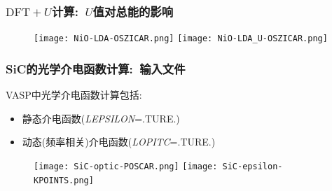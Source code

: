 \frame%
{
	\frametitle{$\mathrm{DFT}+U$计算:~$U$值对总能的影响}
\begin{figure}[h!]
	\vskip -13pt
\centering
\texttt{[image: NiO-LDA-OSZICAR.png]}
\texttt{[image: NiO-LDA\_U-OSZICAR.png]}
\caption{\fontsize{6.2pt}{5.2pt}}%
\label{NiO-LDA_U-tot}
\end{figure}
{\fontsize{6.2pt}{5.2pt}}
}

\frame
{
	\frametitle{\textrm{SiC}的光学介电函数计算:~输入文件}
\textrm{VASP}中光学介电函数计算包括:
\begin{itemize}
	\item 静态介电函数(\textrm{\textit{LEPSILON}=.TURE.})
	\item 动态(频率相关)介电函数(\textrm{\textit{LOPITC}=.TURE.})%
\end{itemize}
\begin{figure}[h!]
\centering
\texttt{[image: SiC-optic-POSCAR.png]}
\texttt{[image: SiC-epsilon-KPOINTS.png]}
\caption{\fontsize{6.2pt}{5.2pt}}%
\label{SiC-optic-Input}
\end{figure}
}


